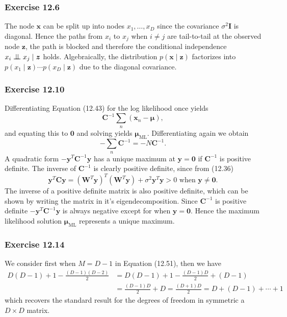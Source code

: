 \documentclass[12pt, a4paper]{article}
\newcommand{\vect}[1]{\bm{#1}}
\newcommand{\bigCI}{\mathrel{\text{\scalebox{1.07}{$\perp\mkern-10mu\perp$}}}}
\begin{document}
\subsubsection*{Exercise 12.6}
The node $\vect{x}$ can be split up into nodes $x_1, \ldots, x_D$ since the covariance $\sigma^2 \vect{I}$ is diagonal.
Hence the paths from $x_i$ to $x_j$ when $i \neq j$ are tail-to-tail at the observed node $\vect{z}$, the path is blocked and therefore the conditional independence $x_i \bigCI x_j \mid \vect{z}$ holds.
Algebraically, the distribution $p(\vect{x} \mid \vect{z})$ factorizes into $p(x_1 \mid \vect{z}) \cdots p(x_D \mid \vect{z})$ due to the diagonal covariance.

\subsubsection*{Exercise 12.10}
Differentiating Equation (12.43) for the log likelihood once yields
\begin{equation*}
	\vect{C}^{-1} \sum_n (\vect{x}_n - \vect{\mu}),
\end{equation*}
and equating this to $\vect{0}$ and solving yields $\vect{\mu}_\text{ML}$.
Differentiating again we obtain
\begin{equation*}
 -\sum_n\vect{C}^{-1} = -N \vect{C}^{-1}.
\end{equation*}
A quadratic form $-\vect{y}^T \vect{C}^{-1} \vect{y}$ has a unique maximum at $\vect{y} = \vect{0}$ if $\vect{C}^{-1}$ is positive definite.
The inverse of $\vect{C}^{-1}$ is clearly positive definite, since from (12.36)
\begin{equation*}
	\vect{y}^T \vect{C} \vect{y} = 
	\left( \vect{W}^T \vect{y} \right)^T \left( \vect{W}^T \vect{y} \right)
	+
	\sigma^2 \vect{y}^T\vect{y} >0 \text{ when } \vect{y} \neq \vect{0}.
\end{equation*}
The inverse of a positive definite matrix is also positive definite, which can be shown by writing the matrix in it's eigendecomposition.
Since $\vect{C}^{-1}$ is positive definite $-\vect{y}^T \vect{C}^{-1} \vect{y}$ is always negative except for when $\vect{y} = \vect{0}$. 
Hence the maximum likelihood solution $\vect{\mu}_\text{ML}$ represents a unique maximum.

\subsubsection*{Exercise 12.14}
We consider first when $M = D - 1$ in Equation (12.51), then we have
\begin{align*}
	D(D-1) + 1 - \frac{(D-1)(D-2)}{2} &=
	D(D-1) + 1 - \frac{(D-1)D}{2} + (D-1) \\
	&= \frac{(D-1)D}{2} + D = \frac{(D+1)D}{2} = D + (D-1) + \cdots + 1
\end{align*}
which recovers the standard result for the degrees of freedom in symmetric a $D \times D$ matrix.
\end{document}
